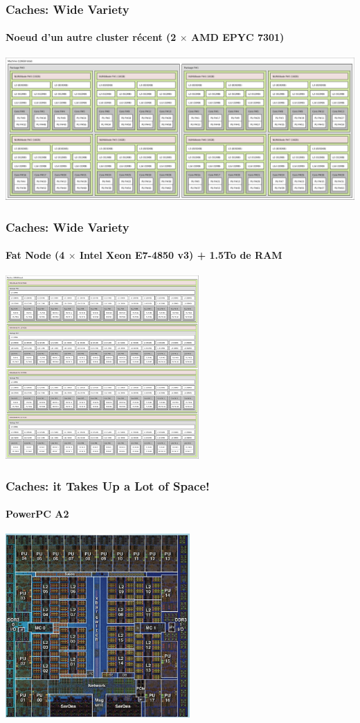 \documentclass[xcolor={x11names,svgnames}]{beamer}
\begin{document}
\begin{frame}[label=caches]
  \frametitle{Caches: Wide Variety}
  \framesubtitle{Noeud d'un autre cluster récent (2 $\times$ AMD EPYC 7301)}
  \centering
  \includegraphics[width=\textwidth]{lstopo_chiclet.pdf}
\end{frame}

\begin{frame}[label=caches]
  \frametitle{Caches: Wide Variety}
  \framesubtitle{Fat Node (4 $\times$ Intel Xeon E7-4850 v3) + 1.5To de RAM}
  \centering
  \includegraphics[height=7cm]{lstopo_wurst.pdf}
\end{frame}

\begin{frame}[label=caches]
  \frametitle{Caches: it Takes Up a Lot of Space!}
  \framesubtitle{PowerPC A2}
  \centering
  \includegraphics[height=7cm]{die-bgq.png}
\end{frame}
\end{document}
